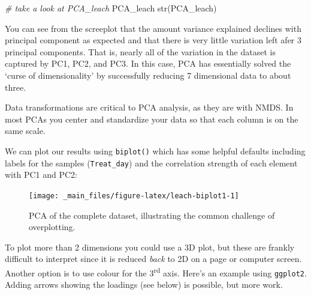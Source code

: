 \documentclass[
  11pt,
  a4paper,
]{book}
\newenvironment{Shaded}{\begin{snugshade}}{\end{snugshade}}
\newcommand{\AttributeTok}[1]{\textcolor[rgb]{0.77,0.63,0.00}{#1}}
\newcommand{\CommentTok}[1]{\textcolor[rgb]{0.56,0.35,0.01}{\textit{#1}}}
\newcommand{\FloatTok}[1]{\textcolor[rgb]{0.00,0.00,0.81}{#1}}
\newcommand{\FunctionTok}[1]{\textcolor[rgb]{0.00,0.00,0.00}{#1}}
\newcommand{\NormalTok}[1]{#1}
\newcommand{\SpecialCharTok}[1]{\textcolor[rgb]{0.00,0.00,0.00}{#1}}
\begin{document}
\begin{Shaded}
\begin{Highlighting}[]
\CommentTok{\# take a look at PCA\_leach}
\NormalTok{PCA\_leach}
\FunctionTok{str}\NormalTok{(PCA\_leach)}
\end{Highlighting}
\end{Shaded}

You can see from the screeplot that the amount variance explained declines with principal component as expected and that there is very little variation left afer 3 principal components. That is, nearly all of the variation in the dataset is captured by PC1, PC2, and PC3. In this case, PCA has essentially solved the `curse of dimensionality' by successfully reducing 7 dimensional data to about three.

Data transformations are critical to PCA analysis, as they are with NMDS. In most PCAs you center and standardize your data so that each column is on the same scale.

We can plot our results using \texttt{biplot()} which has some helpful defaults including labels for the samples (\texttt{Treat\_day}) and the correlation strength of each element with PC1 and PC2:

\begin{Shaded}
\end{Shaded}

\begin{figure}

{\centering \texttt{[image: \_main\_files/figure-latex/leach-biplot1-1]} 

}

\caption{PCA of the complete dataset, illustrating the common challenge of overplotting.}\label{fig:leach-biplot1}
\end{figure}

To plot more than 2 dimensions you could use a 3D plot, but these are frankly difficult to interpret since it is reduced \emph{back} to 2D on a page or computer screen. Another option is to use colour for the 3\textsuperscript{rd} axis. Here's an example using \texttt{ggplot2}. Adding arrows showing the loadings (see below) is possible, but more work.
\end{document}
